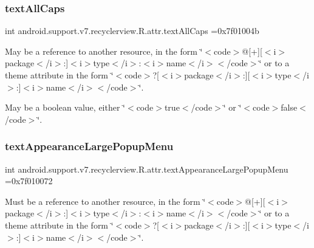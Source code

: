 \subsubsection{\texorpdfstring{text\+All\+Caps}{textAllCaps}}
{\footnotesize\ttfamily int android.\+support.\+v7.\+recyclerview.\+R.\+attr.\+text\+All\+Caps =0x7f01004b\hspace{0.3cm}{\ttfamily [static]}}

May be a reference to another resource, in the form \char`\"{}$<$code$>$@\mbox{[}+\mbox{]}\mbox{[}$<$i$>$package$<$/i$>$\+:\mbox{]}$<$i$>$type$<$/i$>$\+:$<$i$>$name$<$/i$>$$<$/code$>$\char`\"{} or to a theme attribute in the form \char`\"{}$<$code$>$?\mbox{[}$<$i$>$package$<$/i$>$\+:\mbox{]}\mbox{[}$<$i$>$type$<$/i$>$\+:\mbox{]}$<$i$>$name$<$/i$>$$<$/code$>$\char`\"{}. 

May be a boolean value, either \char`\"{}$<$code$>$true$<$/code$>$\char`\"{} or \char`\"{}$<$code$>$false$<$/code$>$\char`\"{}. \mbox{\label{classandroid_1_1support_1_1v7_1_1recyclerview_1_1R_1_1attr_a052a916d3fb130310919b9f8974e8548}} 
\subsubsection{\texorpdfstring{text\+Appearance\+Large\+Popup\+Menu}{textAppearanceLargePopupMenu}}
{\footnotesize\ttfamily int android.\+support.\+v7.\+recyclerview.\+R.\+attr.\+text\+Appearance\+Large\+Popup\+Menu =0x7f010072\hspace{0.3cm}{\ttfamily [static]}}

Must be a reference to another resource, in the form \char`\"{}$<$code$>$@\mbox{[}+\mbox{]}\mbox{[}$<$i$>$package$<$/i$>$\+:\mbox{]}$<$i$>$type$<$/i$>$\+:$<$i$>$name$<$/i$>$$<$/code$>$\char`\"{} or to a theme attribute in the form \char`\"{}$<$code$>$?\mbox{[}$<$i$>$package$<$/i$>$\+:\mbox{]}\mbox{[}$<$i$>$type$<$/i$>$\+:\mbox{]}$<$i$>$name$<$/i$>$$<$/code$>$\char`\"{}. \mbox{\label{classandroid_1_1support_1_1v7_1_1recyclerview_1_1R_1_1attr_a4bd0c87392fa6a5baa7b155f1660b3b0}} 
